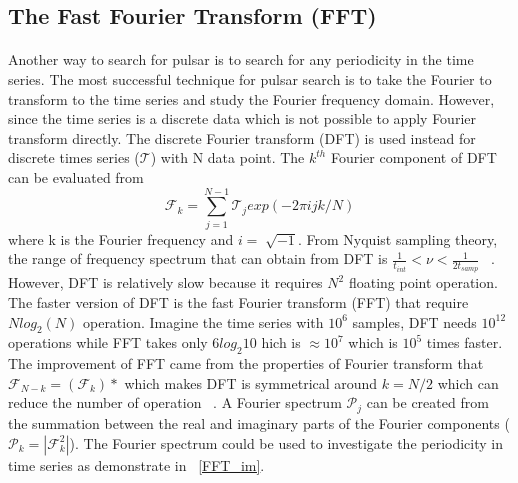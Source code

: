 \documentclass[thesis_msc.tex]{subfiles}
\begin{document}
    	\subsection{The Fast Fourier Transform (FFT)} \label{FFT}
        \paragraph{} Another way to search for pulsar is to search for any periodicity in the time series. The most successful technique for pulsar search is to take the Fourier to transform to the time series and study the Fourier frequency domain. However, since the time series is a discrete data which is not possible to apply Fourier transform directly. The discrete Fourier transform (DFT) is used instead for discrete times series ($\mathcal{T}$) with N data point. The $k^{th}$ Fourier component of DFT can be evaluated from        
 \begin{equation}
 \mathcal{F}_k=\sum_{j=1}^{N-1} \mathcal{T}_j exp(-2\pi ijk/N)
 \end{equation}
 where k is the Fourier frequency and $i = \sqrt[]{-1}$. From Nyquist sampling theory, the range of frequency spectrum that can obtain from DFT is $\frac{1}{t_{int}}<\nu<\frac{1}{2 t_{samp}}$ ~\citep{ransom2002fourier}. However, DFT is relatively slow because it requires $N^2$ floating point operation. The faster version of DFT is the fast Fourier transform (FFT) that require $Nlog_2(N)$ operation. Imagine the time series with $10^6$ samples, DFT needs $10^{12}$ operations while FFT takes only $6log_2 10$ hich is $\approx 10^7$ which is $10^5$ times faster. The improvement of FFT came from the properties of Fourier transform that $\mathcal{F}_{N-k}=(\mathcal{F}_k)*$ which makes DFT is symmetrical around $k=N/2$ which can reduce the number of operation ~\citep{FFT}. A Fourier spectrum $\mathcal{P}_j$ can be created from the summation between the real and imaginary parts of the Fourier components ($\mathcal{P}_k=|\mathcal{F}_k^2|$). The Fourier spectrum could be used to investigate the periodicity in time series as demonstrate in ~\ref{FFT_im}.  
 
\end{document}
